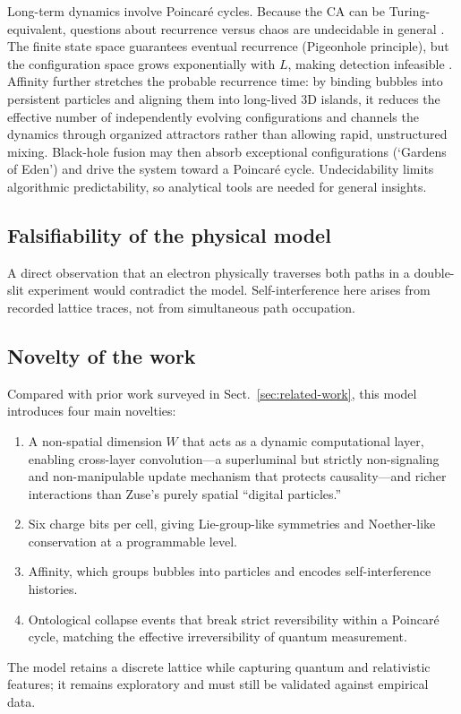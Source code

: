 \documentclass{ijuc}
\begin{document}
Long-term dynamics involve Poincaré cycles. Because the CA can be Turing-equivalent, questions about recurrence versus chaos are undecidable in general \cite{wolfram1983,gacs1979}. The finite state space guarantees eventual recurrence (Pigeonhole principle), but the configuration space grows exponentially with $L$, making detection infeasible \cite{bernstein2007,toffoli1980}. Affinity further stretches the probable recurrence time: by binding bubbles into persistent particles and aligning them into long-lived 3D islands, it reduces the effective number of independently evolving configurations and channels the dynamics through organized attractors rather than allowing rapid, unstructured mixing. Black-hole fusion may then absorb exceptional configurations (`Gardens of Eden') and drive the system toward a Poincaré cycle. Undecidability limits algorithmic predictability, so analytical tools are needed for general insights.

\subsection{Falsifiability of the physical model}

A direct observation that an electron physically traverses both paths in a double-slit experiment would contradict the model. Self-interference here arises from recorded lattice traces, not from simultaneous path occupation. 

\subsection{Novelty of the work}

Compared with prior work surveyed in Sect.~\ref{sec:related-work}, this model introduces four main novelties:
\begin{enumerate}
  \item A non-spatial dimension $W$ that acts as a dynamic computational layer, enabling cross-layer convolution---a superluminal but strictly non-signaling and non-manipulable update mechanism that protects causality---and richer interactions than Zuse's purely spatial ``digital particles.''
  \item Six charge bits per cell, giving Lie-group-like symmetries and Noether-like conservation at a programmable level.
  \item Affinity, which groups bubbles into particles and encodes self-interference histories.
  \item Ontological collapse events that break strict reversibility within a Poincar\'{e} cycle, matching the effective irreversibility of quantum measurement.
\end{enumerate}
The model retains a discrete lattice while capturing quantum and relativistic features; it remains exploratory and must still be validated against empirical data.
\end{document}
